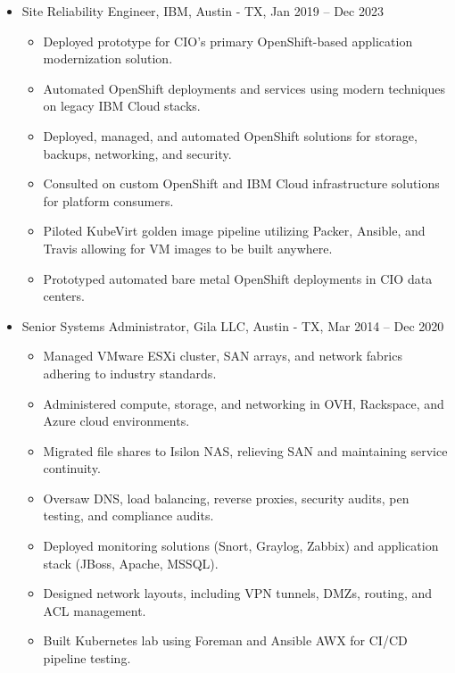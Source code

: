 \documentclass[letterpaper]{article}
\begin{document}
\begin{minipage}{\dimexpr\textwidth-1in\relax}
\begin{itemize}
    \item Site Reliability Engineer, IBM, Austin - TX, Jan 2019 -- Dec 2023
    \begin{itemize}
        \item Deployed prototype for CIO's primary OpenShift-based application modernization solution.
        \item Automated OpenShift deployments and services using modern techniques on legacy IBM Cloud stacks.
        \item Deployed, managed, and automated OpenShift solutions for storage, backups, networking, and security.
        \item Consulted on custom OpenShift and IBM Cloud infrastructure solutions for platform consumers.
        \item Piloted KubeVirt golden image pipeline utilizing Packer, Ansible, and Travis allowing for VM images to be built anywhere. 
        \item Prototyped automated bare metal OpenShift deployments in CIO data centers. \\
    \end{itemize}
\end{itemize}

\begin{itemize}
    \item Senior Systems Administrator, Gila LLC, Austin - TX, Mar 2014 -- Dec 2020
    \begin{itemize}
        \item Managed VMware ESXi cluster, SAN arrays, and network fabrics adhering to industry standards.
        \item Administered compute, storage, and networking in OVH, Rackspace, and Azure cloud environments.
        \item Migrated file shares to Isilon NAS, relieving SAN and maintaining service continuity.
        \item Oversaw DNS, load balancing, reverse proxies, security audits, pen testing, and compliance audits.
        \item Deployed monitoring solutions (Snort, Graylog, Zabbix) and application stack (JBoss, Apache, MSSQL).
        \item Designed network layouts, including VPN tunnels, DMZs, routing, and ACL management.
        \item Built Kubernetes lab using Foreman and Ansible AWX for CI/CD pipeline testing. \\
    \end{itemize}
\end{itemize}


\end{minipage}
\end{document}
